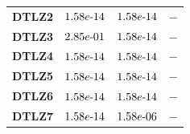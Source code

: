 \documentclass{article}
\begin{document}
\begin{table}[!htp]
\begin{tiny}
\begin{tabular}{c|ccc}
\textbf{DTLZ2} & $\cellcolor{gray25} 1.58e\makebox[0.1cm]{-}14 $ & $ \cellcolor{gray25} 1.58e\makebox[0.1cm]{-}14 $ & $ -$ \\
\textbf{DTLZ3} & $2.85e\makebox[0.1cm]{-}01 $ & $ \cellcolor{gray25} 1.58e\makebox[0.1cm]{-}14 $ & $ -$ \\
\textbf{DTLZ4} & $\cellcolor{gray25} 1.58e\makebox[0.1cm]{-}14 $ & $ \cellcolor{gray25} 1.58e\makebox[0.1cm]{-}14 $ & $ -$ \\
\textbf{DTLZ5} & $\cellcolor{gray25} 1.58e\makebox[0.1cm]{-}14 $ & $ \cellcolor{gray25} 1.58e\makebox[0.1cm]{-}14 $ & $ -$ \\
\textbf{DTLZ6} & $\cellcolor{gray25} 1.58e\makebox[0.1cm]{-}14 $ & $ \cellcolor{gray25} 1.58e\makebox[0.1cm]{-}14 $ & $ -$ \\
\textbf{DTLZ7} & $\cellcolor{gray25} 1.58e\makebox[0.1cm]{-}14 $ & $ \cellcolor{gray25} 1.58e\makebox[0.1cm]{-}06 $ & $ -$ \\
  \hline
  \end{tabular}
  \end{tiny}
\end{table}
\end{document}
